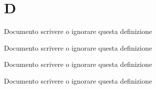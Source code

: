 \documentclass[a4paper, oneside]{article}
\begin{document}
\copertina{}


\newpage
\newpage
\tableofcontents

\newpage

\section{D}
\begin{description}
  \item Documento scrivere o ignorare questa definizione
  \item Documento scrivere o ignorare questa definizione
  \item Documento scrivere o ignorare questa definizione
  \item Documento scrivere o ignorare questa definizione
\end{description}
\newpage
\end{document}
